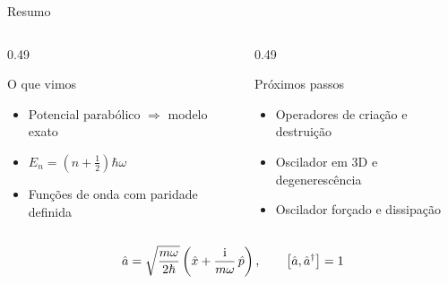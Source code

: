 \begin{frame}{Resumo}
  \begin{columns}[T,onlytextwidth]
    \begin{column}{0.49\textwidth}
      \begin{destaque}{O que vimos}
        \begin{itemize}
          \item Potencial parabólico $\Rightarrow$ modelo exato
          \item $E_n=\left(n+\tfrac12\right)\hbar\omega$
          \item Funções de onda com paridade definida
        \end{itemize}
      \end{destaque}
    \end{column}
    \begin{column}{0.49\textwidth}
      \begin{destaque}[fisicagreen]{Próximos passos}
        \begin{itemize}
          \item Operadores de criação e destruição
          \item Oscilador em $3$D e degenerescência
          \item Oscilador forçado e dissipação
        \end{itemize}
      \end{destaque}
    \end{column}
  \end{columns}

  \vspace{0.5em}
  \begin{equacao}
    \[
      \hat a = \sqrt{\frac{m\omega}{2\hbar}}
      \left(\hat x + \frac{\mathrm{i}}{m\omega}\,\hat p\right),
      \qquad
      \left[\hat a,\hat a^\dagger\right] = 1
    \]
  \end{equacao}
\end{frame}
